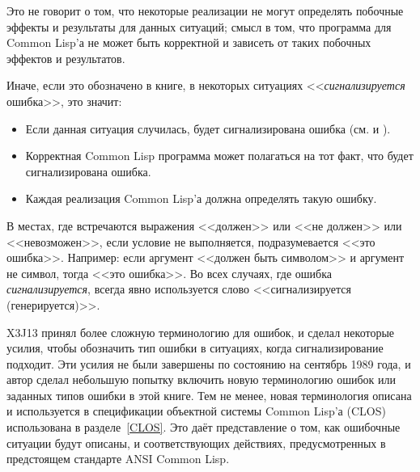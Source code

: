 Это не говорит о том, что некоторые реализации не могут определять
побочные эффекты и результаты для данных ситуаций; смысл в том, что программа для
Common Lisp'а не может быть корректной и зависеть от таких побочных эффектов и результатов.

Иначе, если это обозначено в книге, в некоторых ситуациях
<<\emph{сигнализируется} ошибка>>, это значит: 
\begin{itemize}
\item Если данная ситуация случилась, будет сигнализирована ошибка
(см.  и ).

\item Корректная Common Lisp программа может полагаться на тот факт, что будет
сигнализирована ошибка.

\item Каждая реализация Common Lisp'а должна определять такую ошибку.
\end{itemize}

В местах, где встречаются выражения <<должен>> или <<не должен>> или
<<невозможен>>, если условие не
выполняется, подразумевается <<это ошибка>>. Например: если аргумент <<должен
быть символом>> и аргумент не символ, тогда <<это
ошибка>>. Во всех случаях, где ошибка \emph{сигнализируется}, всегда явно
используется слово <<сигнализируется (генерируется)>>. 

\begin{newer}
X3J13 принял более сложную терминологию для ошибок,
и сделал некоторые усилия, чтобы обозначить тип ошибки в ситуациях, когда
сигнализирование подходит. Эти усилия 
не были завершены по состоянию на сентябрь 1989 года, и автор сделал небольшую
попытку включить новую терминологию ошибок или
заданных типов ошибки в этой книге. Тем не менее, новая терминология
описана и используется в спецификации
объектной системы Common Lisp'а (CLOS) использована в разделе~\ref{CLOS}.
Это даёт представление о том, как ошибочные ситуации будут описаны,
и соответствующих действиях, предусмотренных в предстоящем стандарте ANSI Common
Lisp.
\end{newer}

